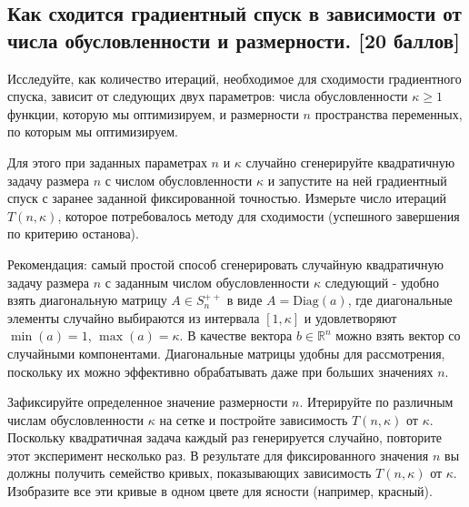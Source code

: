\documentclass[
  russian,
  letterpaper,
  DIV=11,
  numbers=noendperiod]{scrartcl}
\begin{document}
\subsection{\texorpdfstring{\textbf{Как сходится градиентный спуск в
зависимости от числа обусловленности и размерности.} {[}20
баллов{]}}{Как сходится градиентный спуск в зависимости от числа обусловленности и размерности. {[}20 баллов{]}}}\label{ux43aux430ux43a-ux441ux445ux43eux434ux438ux442ux441ux44f-ux433ux440ux430ux434ux438ux435ux43dux442ux43dux44bux439-ux441ux43fux443ux441ux43a-ux432-ux437ux430ux432ux438ux441ux438ux43cux43eux441ux442ux438-ux43eux442-ux447ux438ux441ux43bux430-ux43eux431ux443ux441ux43bux43eux432ux43bux435ux43dux43dux43eux441ux442ux438-ux438-ux440ux430ux437ux43cux435ux440ux43dux43eux441ux442ux438.-20-ux431ux430ux43bux43bux43eux432}

Исследуйте, как количество итераций, необходимое для сходимости
градиентного спуска, зависит от следующих двух параметров: числа
обусловленности \(\kappa \geq 1\) функции, которую мы оптимизируем, и
размерности \(n\) пространства переменных, по которым мы оптимизируем.

Для этого при заданных параметрах \(n\) и \(\kappa\) случайно
сгенерируйте квадратичную задачу размера \(n\) с числом обусловленности
\(\kappa\) и запустите на ней градиентный спуск с заранее заданной
фиксированной точностью. Измерьте число итераций \(T(n,\kappa)\),
которое потребовалось методу для сходимости (успешного завершения по
критерию останова).

Рекомендация: самый простой способ сгенерировать случайную квадратичную
задачу размера \(n\) с заданным числом обусловленности \(\kappa\)
следующий - удобно взять диагональную матрицу \(A \in S_{n}^{++}\) в
виде \(A = \text{Diag}(a)\), где диагональные элементы случайно
выбираются из интервала \([1, \kappa]\) и удовлетворяют \(\min(a) = 1\),
\(\max(a) = \kappa\). В качестве вектора \(b \in \mathbb{R}^n\) можно
взять вектор со случайными компонентами. Диагональные матрицы удобны для
рассмотрения, поскольку их можно эффективно обрабатывать даже при
больших значениях \(n\).

Зафиксируйте определенное значение размерности \(n\). Итерируйте по
различным числам обусловленности \(\kappa\) на сетке и постройте
зависимость \(T(n,\kappa)\) от \(\kappa\). Поскольку квадратичная задача
каждый раз генерируется случайно, повторите этот эксперимент несколько
раз. В результате для фиксированного значения \(n\) вы должны получить
семейство кривых, показывающих зависимость \(T(n, \kappa)\) от
\(\kappa\). Изобразите все эти кривые в одном цвете для ясности
(например, красный).
\end{document}
